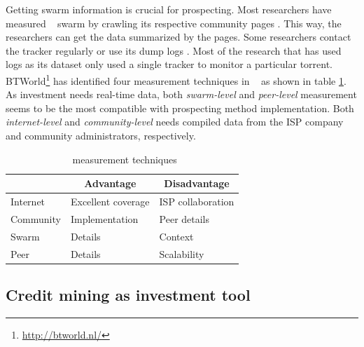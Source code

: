 Getting swarm information is crucial for prospecting. Most researchers have measured \bt~ swarm by crawling its respective community pages \cite{2013:survivepriv:jia, 2005:bittorrentcooperation:andrade, 2014:userbehaviourprivate:jia, 2010:pubpriv:meulpolder, 2014:sustainabilitytorrent:chen, 2012:economicbt:kash, 2013:investmentcm:capota, 2009:demandsupplyres:andrade, 2011:interswarm:capota}. This way, the researchers can get the data summarized by the pages. Some researchers contact the tracker regularly or use its dump logs \cite{2011:yoshida:crawlbtnet, 2005:bittorrentcooperation:andrade,  2015:freeriderinbtcommunity:das, 2011:interswarm:capota}. Most of the research that has used logs as its dataset only used a single tracker to monitor a particular torrent. BTWorld\footnote{\url{http://btworld.nl/}} has identified four measurement techniques in \bt~\cite{2010:btworld:wojciechowski} as shown in table \ref{tbl:btmeasuremethod}. As investment needs real-time data, both \textit{swarm-level} and \textit{peer-level} measurement seems to be the most compatible with prospecting method implementation. Both \textit{internet-level} and \textit{community-level} needs compiled data from the ISP company and community administrators, respectively.


\begin{table}[ht]
	\centering
	\caption{\bt~measurement techniques \cite{2010:btworld:wojciechowski}}
	\label{tbl:btmeasuremethod}
	\begin{tabular}{|l|l|l|}
		\hline
		\rowcolor[HTML]{C0C0C0} 
		\multicolumn{1}{|c|}{\cellcolor[HTML]{C0C0C0}\textbf{Level}} & \multicolumn{1}{c|}{\cellcolor[HTML]{C0C0C0}\textbf{Advantage}} & \multicolumn{1}{c|}{\cellcolor[HTML]{C0C0C0}\textbf{Disadvantage}} \\ \hline
		Internet & Excellent coverage & ISP collaboration \\ \hline
		Community & Implementation & Peer details \\ \hline
		Swarm & Details & Context \\ \hline
		Peer & Details & Scalability \\ \hline
	\end{tabular}
\end{table}

\subsection{Credit mining as investment tool}

